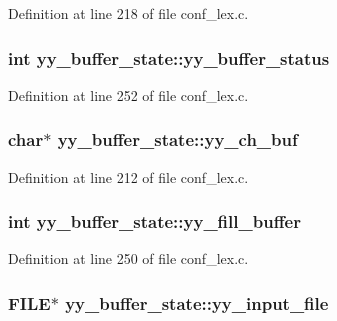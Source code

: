 Definition at line 218 of file conf\_\-lex.c.
\subsubsection[{yy\_\-buffer\_\-status}]{\setlength{\rightskip}{0pt plus 5cm}int {\bf yy\_\-buffer\_\-state::yy\_\-buffer\_\-status}}\label{structyy__buffer__state_70fd925d37a2f0454fbd0def675d106c}




Definition at line 252 of file conf\_\-lex.c.
\subsubsection[{yy\_\-ch\_\-buf}]{\setlength{\rightskip}{0pt plus 5cm}char$\ast$ {\bf yy\_\-buffer\_\-state::yy\_\-ch\_\-buf}}\label{structyy__buffer__state_d7b8df8d8a4688e57b0b8d3ca75adc85}




Definition at line 212 of file conf\_\-lex.c.
\subsubsection[{yy\_\-fill\_\-buffer}]{\setlength{\rightskip}{0pt plus 5cm}int {\bf yy\_\-buffer\_\-state::yy\_\-fill\_\-buffer}}\label{structyy__buffer__state_63d2afbb1d79a3fc63df9e12626f827d}




Definition at line 250 of file conf\_\-lex.c.
\subsubsection[{yy\_\-input\_\-file}]{\setlength{\rightskip}{0pt plus 5cm}FILE$\ast$ {\bf yy\_\-buffer\_\-state::yy\_\-input\_\-file}}\label{structyy__buffer__state_4843d1422e3276b636d475a3095bd948}




